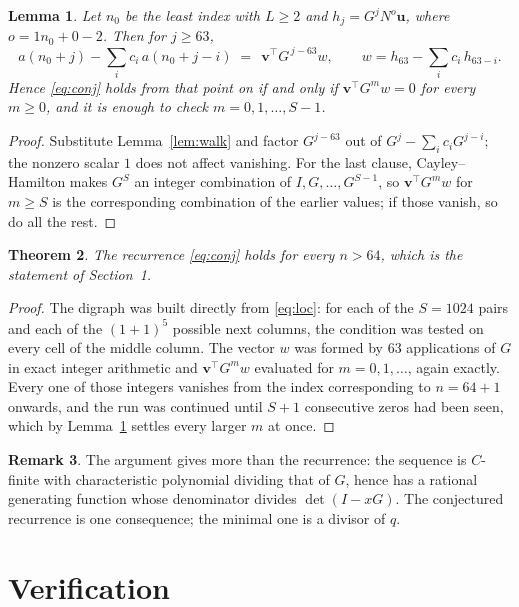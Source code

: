 \documentclass[11pt,a4paper]{article}
\theoremstyle{plain}
\newtheorem{theorem}{Theorem}
\newtheorem{lemma}[theorem]{Lemma}
\theoremstyle{definition}
\newtheorem{remark}[theorem]{Remark}
\begin{document}
\begin{lemma}\label{lem:crit}
Let $n_0$ be the least index with $L\ge2$ and $h_j=G^{j}N^{o}\mathbf{u}$, where
$o=1n_0+0-2$. Then for $j\ge63$,
\[
a(n_0+j)-\sum_i c_i\,a(n_0+j-i)\;=\;\,\mathbf{v}^{\!\top}G^{\,j-63}w,
\qquad w=h_{63}-\sum_i c_i\,h_{63-i} .
\]
Hence \eqref{eq:conj} holds from that point on if and only if
$\mathbf{v}^{\!\top}G^{m}w=0$ for every $m\ge0$, and it is enough to check
$m=0,1,\dots,S-1$.
\end{lemma}

\begin{proof}
Substitute Lemma~\ref{lem:walk} and factor $G^{j-63}$ out of
$G^{j}-\sum_ic_iG^{j-i}$; the nonzero scalar $1$ does not affect
vanishing. For the last clause, Cayley--Hamilton makes $G^{S}$ an integer combination of
$I,G,\dots,G^{S-1}$, so $\mathbf{v}^{\!\top}G^{m}w$ for $m\ge S$ is the corresponding
combination of the earlier values; if those vanish, so do all the rest.
\end{proof}

\begin{theorem}
The recurrence \eqref{eq:conj} holds for every $n>64$, which is the statement of
Section~1.
\end{theorem}

\begin{proof}
The digraph was built directly from \eqref{eq:loc}: for each of the $S=1024$ pairs and each
of the $(1+1)^{5}$ possible next columns, the condition was tested on every cell of
the middle column. The vector $w$ was formed by $63$ applications of $G$ in exact integer
arithmetic and $\mathbf{v}^{\!\top}G^{m}w$ evaluated for $m=0,1,\dots$, again exactly.
Every one of those integers vanishes from the index corresponding to $n=64+1$ onwards,
and the run was continued until $S+1$ consecutive zeros had been seen, which by
Lemma~\ref{lem:crit} settles every larger $m$ at once.
\end{proof}

\begin{remark}
The argument gives more than the recurrence: the sequence is $C$-finite with characteristic
polynomial dividing that of $G$, hence has a rational generating function whose denominator
divides $\det(I-xG)$. The conjectured recurrence is one consequence; the minimal one is a
divisor of $q$.
\end{remark}

\section{Verification}
\end{document}

